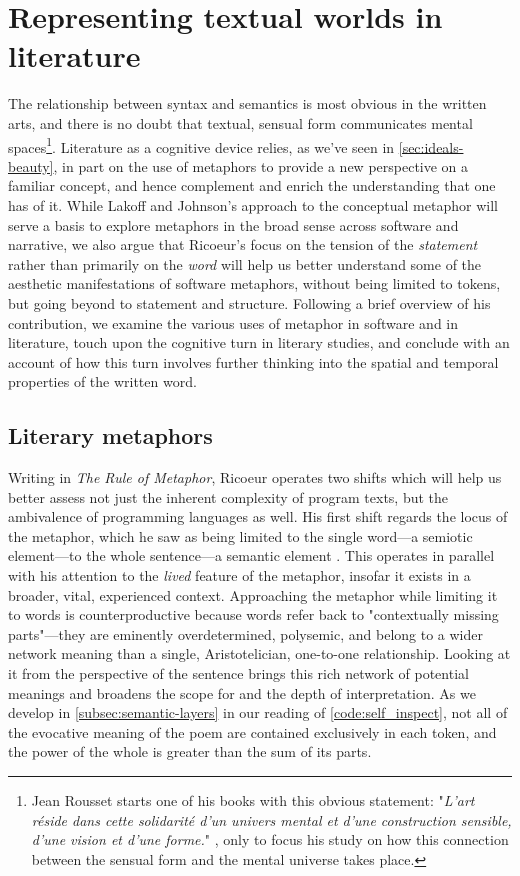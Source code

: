 \section{Representing textual worlds in literature}
\label{sec:aesthetic-literature}

The relationship between syntax and semantics is most obvious in the written arts, and there is no doubt that textual, sensual form communicates mental spaces\footnote{Jean Rousset starts one of his books with this obvious statement: "\emph{L’art réside dans cette solidarité d’un univers mental et d’une construction sensible, d’une vision et d’une forme.}" \citep{rousset_forme_1964}, only to focus his study on how this connection between the sensual form and the mental universe takes place.}. Literature as a cognitive device relies, as we've seen in \autoref{sec:ideals-beauty}, in part on the use of metaphors to provide a new perspective on a familiar concept, and hence complement and enrich the understanding that one has of it. While Lakoff and Johnson's approach to the conceptual metaphor will serve a basis to explore metaphors in the broad sense across software and narrative, we also argue that Ricoeur's focus on the tension of the \emph{statement} rather than primarily on the \emph{word} will help us better understand some of the aesthetic manifestations of software metaphors, without being limited to tokens, but going beyond to statement and structure. Following a brief overview of his contribution, we examine the various uses of metaphor in software and in literature, touch upon the cognitive turn in literary studies, and conclude with an account of how this turn involves further thinking into the spatial and temporal properties of the written word.

\subsection{Literary metaphors}
\label{subsec:literary-metaphors}

Writing in \emph{The Rule of Metaphor}, Ricoeur operates two shifts which will help us better assess not just the inherent complexity of program texts, but the ambivalence of programming languages as well. His first shift regards the locus of the metaphor, which he saw as being limited to the single word—a semiotic element—to the whole sentence—a semantic element \citep{ricoeur_rule_2003}. This operates in parallel with his attention to the \emph{lived} feature of the metaphor, insofar it exists in a broader, vital, experienced context. Approaching the metaphor while limiting it to words is counterproductive because words refer back to "contextually missing parts"—they are eminently overdetermined, polysemic, and belong to a wider network meaning than a single, Aristotelician, one-to-one relationship. Looking at it from the perspective of the sentence brings this rich network of potential meanings and broadens the scope for and the depth of interpretation. As we develop in \autoref{subsec:semantic-layers} in our reading of \autoref{code:self_inspect}, not all of the evocative meaning of the poem are contained exclusively in each token, and the power of the whole is greater than the sum of its parts.

